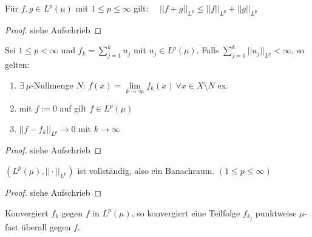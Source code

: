   \begin{theorem}
    Für $f,g \in L^p(\mu)$ mit $1 \leq p \leq \infty$ gilt: \ \ $|| f+g ||_{L^p} \leq ||f||_{L^p} + ||g||_{L^p}$
  \end{theorem}

  \begin{proof}
    siehe Aufschrieb
  \end{proof}

  \begin{lemma}
    Sei $1 \leq p < \infty$ und $f_k = \sum\limits_{j=1}^k u_j$ mit $u_j \in L^p(\mu)$. Falls $\sum\limits_{j=1}^k ||u_j||_{L^p} < \infty$, so gelten:
    \begin{enumerate}[label=\roman*)]
      \item $\exists \ \mu$-Nullmenge $N$: $f(x) = \lim\limits_{k \to \infty} f_k(x) \ \forall x \in X \setminus N$ ex.
      \item mit $f := 0$ auf gilt $f \in L^p(\mu)$
      \item $||f - f_k||_{L^p} \to 0$ mit $k \to \infty$
    \end{enumerate}
  \end{lemma}

  \begin{proof}
    siehe Aufschrieb
  \end{proof}

  \begin{theorem}
    $(L^p(\mu), ||\cdot||_{L^p})$ ist vollständig, also ein Banachraum. $(1 \leq p \leq \infty)$
  \end{theorem}
  \begin{proof}
    siehe Aufschrieb
  \end{proof}

  \begin{lemma}
    Konvergiert $f_k$ gegen $f$ in $L^p(\mu)$, so konvergiert eine Teilfolge $f_{k_j}$ punktweise $\mu$-fast überall gegen $f$.
  \end{lemma}  
  
